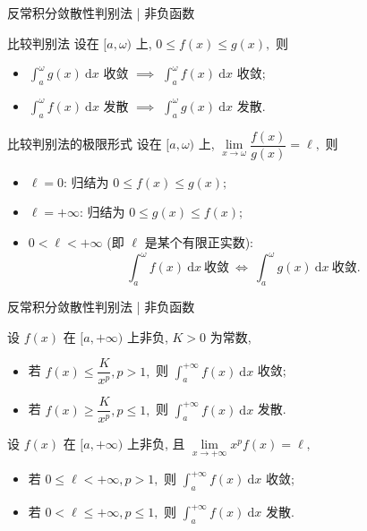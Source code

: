 \begin{frame}{反常积分敛散性判别法 | 非负函数}

\begin{block}{比较判别法}
设在 $[a, \omega)$ 上, $0 \leqslant f(x) \leqslant g(x),$ 则
\begin{itemize}[<+->]
\item $\int_a^\omega g(x) ~ \mathrm{d} x $ 收敛 $\implies$ $\int_a^\omega f(x) ~ \mathrm{d} x $ 收敛;
\item $\int_a^\omega f(x) ~ \mathrm{d} x $ 发散 $\implies$ $\int_a^\omega g(x) ~ \mathrm{d} x $ 发散.
\end{itemize}
\end{block}

\pause

\begin{block}{比较判别法的极限形式}
设在 $[a, \omega)$ 上, $\lim\limits_{x \to \omega} \dfrac{f(x)}{g(x)} = \ell,$ 则
\begin{itemize}[<+->]
\item $\ell = 0$:
归结为 $0 \leqslant f(x) \leqslant g(x);$
\item $\ell = +\infty$:
归结为 $0 \leqslant g(x) \leqslant f(x);$
\item $0 < \ell < +\infty$ (即 $\ell$ 是某个有限正实数):
\vspace{-0.5em}
\[\int_a^\omega f(x) ~ \mathrm{d} x ~ \text{收敛} ~ \Longleftrightarrow ~ \int_a^\omega g(x) ~ \mathrm{d} x ~ \text{收敛}.\]
\end{itemize}
\end{block}

\end{frame}


\begin{frame}{反常积分敛散性判别法 | {\smaller[1] 非负函数}}

\begin{thm}
设 $f(x)$ 在 $[a, +\infty)$ 上非负, $K > 0$ 为常数,
\begin{itemize}
\item 若 $f(x) \leqslant \dfrac{K}{x^p}, p > 1,$ 则 $\int_a^{+\infty} f(x) ~ \mathrm{d} x $ 收敛;
\item 若 $f(x) \geqslant \dfrac{K}{x^p}, p \leqslant 1,$ 则 $\int_a^{+\infty} f(x) ~ \mathrm{d} x $ 发散.
\end{itemize}
\end{thm}

\pause

\begin{thm}
设 $f(x)$ 在 $[a, +\infty)$ 上非负, 且 $\lim\limits_{x \to +\infty} x^p f(x) = \ell,$
\begin{itemize}
\item 若 $0 \leqslant \ell < +\infty, p > 1,$ 则 $\int_a^{+\infty} f(x) ~ \mathrm{d} x $ 收敛;
\item 若 $0 < \ell \leqslant +\infty, p \leqslant 1,$ 则 $\int_a^{+\infty} f(x) ~ \mathrm{d} x $ 发散.
\end{itemize}
\end{thm}

\end{frame}

